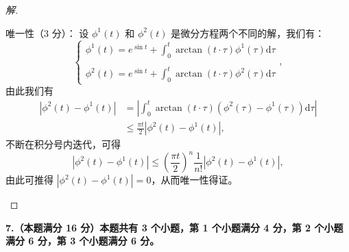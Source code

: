 \begin{proof}[解]
\begin{enumerate}[label=(\arabic*)]
唯一性（3 分）：
设 $\phi^{1}(t)$ 和 $\phi^{2}(t)$ 是微分方程两个不同的解，我们有：
\[\begin{cases}
\displaystyle\phi^{1}(t)=e^{\sin t}+\int_{0}^{t} \arctan (t \cdot \tau) \phi^{1}(\tau)\mathrm{d}\tau \\ \\
\displaystyle\phi^{2}(t)=e^{\sin t}+\int_{0}^{t} \arctan (t \cdot \tau) \phi^{2}(\tau)\mathrm{d}\tau
\end{cases},\]
由此我们有
\begin{align*}
|\phi^{2}(t)-\phi^{1}(t)|&=\left|\int_{0}^{t} \arctan (t \cdot \tau)(\phi^{2}(\tau)-\phi^{1}(\tau)) \mathrm{d}\tau\right| \\
&\leq \frac{\pi t}{2}|\phi^{2}(t)-\phi^{1}(t)|,
\end{align*}
不断在积分号内迭代，可得
\[|\phi^{2}(t)-\phi^{1}(t)| \leq \left(\frac{\pi t}{2}\right)^{n} \frac{1}{n!}|\phi^{2}(t)-\phi^{1}(t)|,\]
由此可推得 $|\phi^{2}(t)-\phi^{1}(t)|=0$，从而唯一性得证。\qedhere
\end{enumerate}
\end{proof}

\textbf{7.（本题满分 16 分）本题共有 3 个小题，第 1 个小题满分 4 分，第 2 个小题满分 6 分，第 3 个小题满分 6 分。}

